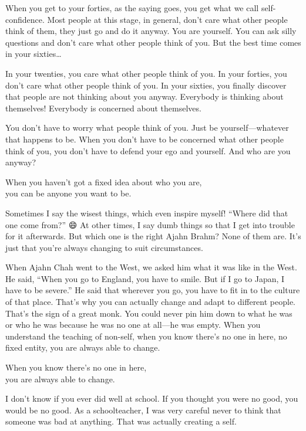 \documentclass[12pt, openany]{book}
\newenvironment{aphorism}%
{%
\begin{center}\begin{itshape}
}%
{\end{itshape}\end{center}
}%
\begin{document}
When you get to your forties, as the saying goes, you get what we call self-confidence. Most people at this stage, in general, don’t care what other people think of them, they just go and do it anyway. You are yourself. You can ask silly questions and don’t care what other people think of you. But the best time comes in your sixties… 

In your twenties, you care what other people think of you. In your forties, you don’t care what other people think of you. In your sixties, you finally discover that people are not thinking about you anyway. Everybody is thinking about themselves! Everybody is concerned about themselves. 

You don’t have to worry what people think of you. Just be yourself—whatever that happens to be. When you don’t have to be concerned what other people think of you, you don’t have to defend your ego and yourself. And who are you anyway? 

\begin{aphorism}
When you haven’t got a fixed idea about who you are,\\  
you can be anyone you want to be.
\end{aphorism}

Sometimes I say the wisest things, which even inspire myself! “Where did that one come from?” 😄 At other times, I say dumb things so that I get into trouble for it afterwards. But which one is the right Ajahn Brahm? None of them are. It’s just that you’re always changing to suit circumstances. 

When Ajahn Chah went to the West, we asked him what it was like in the West. He said, “When you go to England, you have to smile. But if I go to Japan, I have to be severe.” He said that wherever you go, you have to fit in to the culture of that place. That’s why you can actually change and adapt to different people. That’s the sign of a great monk. You could never pin him down to what he was or who he was because he was no one at all—he was empty. When you understand the teaching of non-self, when you know there’s no one in here, no fixed entity, you are always able to change. 

\begin{aphorism}
When you know there’s no one in here,\\  
you are always able to change.
\end{aphorism}

I don’t know if you ever did well at school. If you thought you were no good, you would be no good. As a schoolteacher, I was very careful never to think that someone was bad at anything. That was actually creating a self. 
\end{document}
